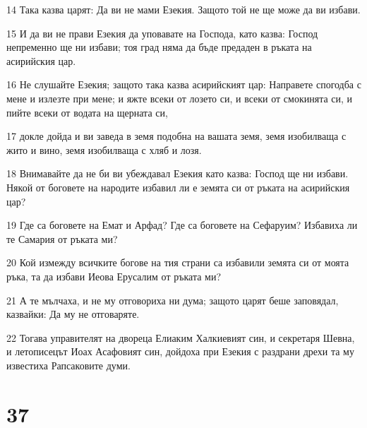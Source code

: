 \par 14 Така казва царят: Да ви не мами Езекия. Защото той не ще може да ви избави.
\par 15 И да ви не прави Езекия да уповавате на Господа, като казва: Господ непременно ще ни избави; тоя град няма да бъде предаден в ръката на асирийския цар.
\par 16 Не слушайте Езекия; защото така казва асирийският цар: Направете спогодба с мене и излезте при мене; и яжте всеки от лозето си, и всеки от смокинята си, и пийте всеки от водата на щерната си,
\par 17 докле дойда и ви заведа в земя подобна на вашата земя, земя изобилваща с жито и вино, земя изобилваща с хляб и лозя.
\par 18 Внимавайте да не би ви убеждавал Езекия като казва: Господ ще ни избави. Някой от боговете на народите избавил ли е земята си от ръката на асирийския цар?
\par 19 Где са боговете на Емат и Арфад? Где са боговете на Сефаруим? Избавиха ли те Самария от ръката ми?
\par 20 Кой измежду всичките богове на тия страни са избавили земята си от моята ръка, та да избави Иеова Ерусалим от ръката ми?
\par 21 А те мълчаха, и не му отговориха ни дума; защото царят беше заповядал, казвайки: Да му не отговаряте.
\par 22 Тогава управителят на двореца Елиаким Халкиевият син, и секретаря Шевна, и летописецът Иоах Асафовият син, дойдоха при Езекия с раздрани дрехи та му известиха Рапсаковите думи.

\chapter{37}

